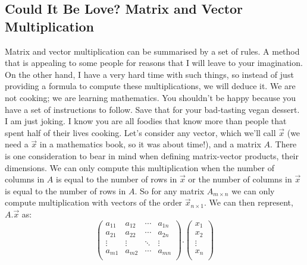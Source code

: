 \documentclass[a4,12pt,twosided,openany]{memoir}
\begin{document}
\subsection{Could It Be Love? Matrix and Vector Multiplication}
\par 
\indent
Matrix and vector multiplication can be summarised by a set of rules. A method that is appealing to some people for reasons that I will leave to your imagination. On the other hand, I have a very hard time with such things, so instead of just providing a formula to compute these multiplications, we will deduce it. We are not cooking; we are learning mathematics. You shouldn’t be happy because you have a set of instructions to follow. Save that for your bad-tasting vegan dessert. I am just joking. I know you are all foodies that know more than people that spent half of their lives cooking. Let’s consider any vector, which we’ll call $\overrightarrow{x}$ (we need a  $\overrightarrow{x}$ in a mathematics book, so it was about time!), and a matrix $A$. There is one consideration to bear in mind when defining matrix-vector products, their dimensions. We can only compute this multiplication when the number of columns in $A$ is equal to the number of rows in $\overrightarrow{x}$ or the number of columns in $\overrightarrow{x}$ is equal to the number of rows in $A$. So for any matrix $A_{m \times n}$ we can only compute multiplication with vectors of the order $\overrightarrow{x}_{n \times 1}$. We can then represent, $A.\overrightarrow{x}$ as:
\begin{equation} \label{eq:multi}
\begin{pmatrix}
a_{11} & a_{12} & \cdots & a_{1n}\\
a_{21} & a_{22} & \cdots & a_{2n}\\
\vdots & \vdots & \ddots & \vdots\\
a_{m1} & a_{m2} & \cdots & a_{mn}\\
\end{pmatrix}. \begin{pmatrix}
x_{1} \\
x_{2} \\
\vdots \\
x_{n} \\
\end{pmatrix}
\end{equation}
\par 
\indent
\end{document}
